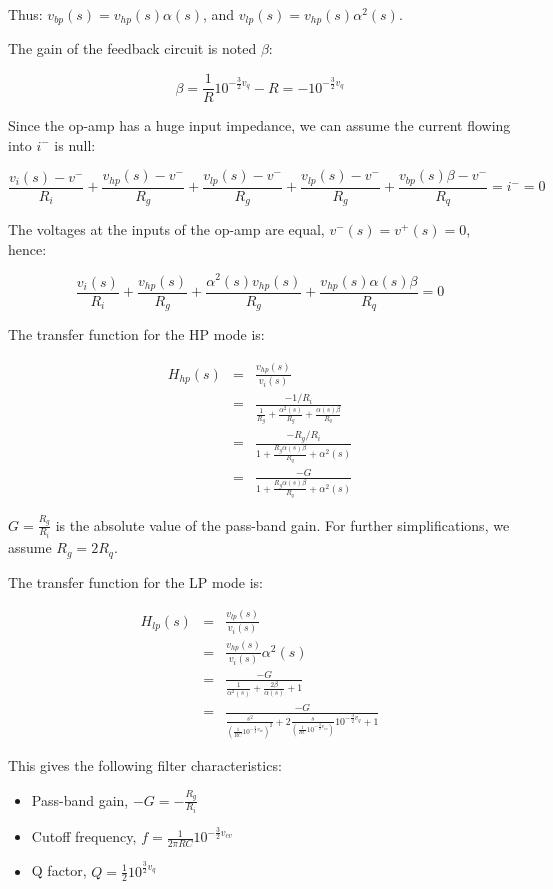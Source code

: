 \documentclass[a4paper,11pt]{article}
\begin{document}
Thus: $v_{bp}(s) = v_{hp}(s) \alpha(s)$, and $v_{lp}(s) = v_{hp}(s) \alpha^2(s)$.

The gain of the feedback circuit is noted $\beta$:

\begin{equation}
\beta = \frac{1}{R} 10^{-\frac{3}{2} v_{q}} -R = -10^{-\frac{3}{2} v_{q}}
\end{equation}

Since the op-amp has a huge input impedance, we can assume the current flowing into $i^-$ is null:

\begin{equation}
\frac{v_i(s) - v^-}{R_i} + \frac{v_{hp}(s) - v^-}{R_g} + \frac{v_{lp}(s) - v^-}{R_g} + \frac{v_{lp}(s) - v^-}{R_g} + \frac{v_{bp}(s) \beta - v^-}{R_q} = i^- = 0
\end{equation}


The voltages at the inputs of the op-amp are equal, $v^-(s) = v^+(s) = 0$, hence:

\begin{equation}
\frac{v_i(s)}{R_i} + \frac{v_{hp}(s)}{R_g} + \frac{\alpha^2(s) v_{hp}(s)}{R_g} + \frac{v_{hp}(s) \alpha(s) \beta}{R_q} = 0
\end{equation}

The transfer function for the HP mode is:

\begin{eqnarray}
H_{hp}(s) &=& \frac{v_{hp}(s)}{v_i(s)} \\
 &=& \frac{-1 / R_i}{\frac{1}{R_g} + \frac{\alpha^2(s)}{R_g} + \frac{\alpha(s)\beta}{R_q}} \\
 &=& \frac{-R_g / R_i}{1 + \frac{R_g \alpha(s)\beta}{R_q} + \alpha^2(s)} \\
 &=& \frac{-G}{1 + \frac{R_g \alpha(s)\beta}{R_q} + \alpha^2(s)}
\end{eqnarray}

$G = \frac{R_g}{R_i}$ is the absolute value of the pass-band gain. For further simplifications, we assume $R_g = 2 R_q$.

The transfer function for the LP mode is:

\begin{eqnarray}
H_{lp}(s) &=& \frac{v_{lp}(s)}{v_i(s)} \\
 &=& \frac{v_{hp}(s)}{v_i(s)} \alpha^2(s) \\
 &=& \frac{-G}{\frac{1}{\alpha^2(s)} + \frac{2\beta}{\alpha(s)} + 1} \\
 &=& \frac{-G}{\frac{s^2}{{\left(\frac{1}{RC} 10 ^ {-\frac{3}{2} v_{cv}}\right)}^2} + 2 \frac{s}{{\left(\frac{1}{RC} 10 ^ {-\frac{3}{2} v_{cv}}\right)}} 10^{-\frac{3}{2} v_{q}} + 1}
\end{eqnarray}

This gives the following filter characteristics:

\begin{itemize}
\item Pass-band gain, $-G = -\frac{R_g}{R_i}$
\item Cutoff frequency, $f = \frac{1}{2 \pi R C} 10 ^ {-\frac{3}{2} v_{cv}}$
\item Q factor, $Q = \frac{1}{2} 10^{\frac{3}{2} v_{q}} $

\end{itemize}
\end{document}
